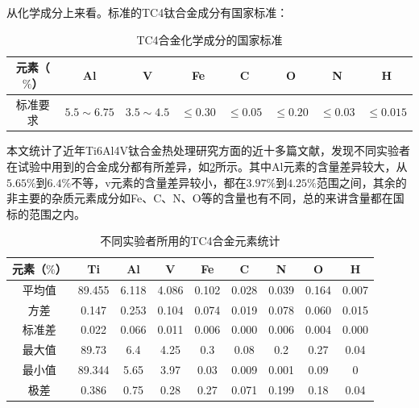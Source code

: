 \documentclass[
class = book,
zihao = -4,
font = noto,
paper = a4paper,
openany
]{easybook}
\newcommand{\ti}{Ti6Al4V}
\begin{document}
从化学成分上来看。标准的TC4钛合金成分有国家标准：
\begin{table}[htbp]
	\centering
	\label{sec:mytc4chem}
	\caption{TC4合金化学成分的国家标准}
	\begin{tabular}{cccccccc}
		\toprule
		元素（$ \% $） & Al & V &Fe &C& O& N &H \\ \midrule
		标准要求 &$ 5.5\sim 6.75 $ & $ 3.5\sim 4.5 $&$ \le 0.30 $ & $ \le 0.05 $&$ \le 0.20 $&$ \le 0.03$ &$ \le 0.015 $  \\ \bottomrule
	\end{tabular}
\end{table}


本文统计了近年\ti 钛合金热处理研究方面的近十多篇文献，发现不同实验者在试验中用到的合金成分都有所差异，如\ref{sec:mytc4ave}所示。其中Al元素的含量差异较大，从$ 5.65\% $到$ 6.4\% $不等，v元素的含量差异较小，都在$ 3.97 \%$到$ 4.25\% $范围之间，其余的非主要的杂质元素成分如Fe、C、N、O等的含量也有不同，总的来讲含量都在国标的范围之内。
\begin{table}[htbp]
	\centering
	\caption{不同实验者所用的TC4合金元素统计}
	\label{sec:mytc4ave}
	\begin{tabular}{ccccccccc}
		\toprule
元素（$ \% $）& Ti  & Al & V &Fe &C& N& O &H \\ \midrule
平均值 & 89.455 & 6.118 & 4.086 & 0.102 & 0.028 & 0.039 & 0.164 & 0.007 \\
方差 & 0.147 & 0.253 & 0.104 & 0.074 & 0.019 & 0.078 & 0.060 & 0.015 \\
标准差 & 0.022 & 0.066 & 0.011 & 0.006 & 0.000 & 0.006 & 0.004 & 0.000 \\
最大值 & 89.73 & 6.4 & 4.25 & 0.3 & 0.08 & 0.2 & 0.27 & 0.04 \\
最小值 & 89.344 & 5.65 & 3.97 & 0.03 & 0.009 & 0.001 & 0.09 & 0 \\
极差 & 0.386 & 0.75 & 0.28 & 0.27 & 0.071 & 0.199 & 0.18 & 0.04 \\
		\bottomrule
	\end{tabular}
\end{table}
\end{document}
